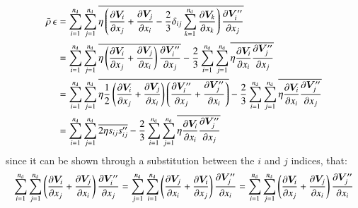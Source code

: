 \documentclass{warpdoc}
\newcommand{\alb}{\vspace{0.2cm}\\} %
\newcommand{\nd}{{{n}_{\rm d}}}
\newcommand{\mfd}{\displaystyle}
\begin{document}
\begin{align*}
    \wbar{\rho}\, \epsilon
     &=\mfd\sum_{i=1}^{\nd} \sum_{j=1}^{\nd}
      \overline{
                    \eta  \left( \frac{\partial \bm{V}_i}{\partial x_j}
                     + \frac{\partial \bm{V}_j}{\partial x_i}
                     - \frac{2}{3}  \delta_{ij}  \sum_{k=1}^{\nd} \frac{\partial \bm{V}_k}{\partial x_k}
                 \right)
                  \frac{\partial \bm{V}_i^{\prime\prime}}{\partial x_j}} \alb
      &=\mfd\sum_{i=1}^{\nd} \sum_{j=1}^{\nd}
            \overline{
               \eta  \left( \frac{\partial \bm{V}_i}{\partial x_j}
             + \frac{\partial \bm{V}_j}{\partial x_i} \right) \frac{\partial \bm{V}_i^{\prime\prime}}{\partial x_j}
            }
      -\frac{2}{3}  \sum_{i=1}^{\nd}\sum_{j=1}^{\nd}
            \overline{ \eta 
                  \frac{\partial \bm{V}_i}     {\partial x_i} 
                  \frac{\partial \bm{V}_j^{\prime\prime}}{\partial x_j}} \alb
      &=\mfd\sum_{i=1}^{\nd} \sum_{j=1}^{\nd}
            \overline{
               \eta  \frac{1}{2}
                   \left( \frac{\partial \bm{V}_i}{\partial x_j}
                        + \frac{\partial \bm{V}_j}{\partial x_i}
                   \right)
                   \left(
                          \frac{\partial \bm{V}_i^{\prime\prime}}{\partial x_j}
                        + \frac{\partial \bm{V}_j^{\prime\prime}}{\partial x_i}
                   \right)
            }
      -\frac{2}{3}  \sum_{i=1}^{\nd}\sum_{j=1}^{\nd}
            \overline{ \eta 
                  \frac{\partial \bm{V}_i}     {\partial x_i}
                   \frac{\partial \bm{V}_j^{\prime\prime}}{\partial x_j}} \alb
      &=\mfd\sum_{i=1}^{\nd} \sum_{j=1}^{\nd}
            \overline{
               2 \eta s_{ij} s_{ij}^{\prime\prime}
            }
      -\frac{2}{3}  \sum_{i=1}^{\nd}\sum_{j=1}^{\nd}
            \overline{ \eta 
                  \frac{\partial \bm{V}_i}     {\partial x_i}
                   \frac{\partial \bm{V}_j^{\prime\prime}}{\partial x_j}} 
\end{align*}
%
since it can be shown through a substitution between the $i$ and $j$ indices, that:
%
\begin{equation}
  \sum_{i=1}^{\nd} \sum_{j=1}^{\nd}
                \left( \frac{\partial \bm{V}_i}{\partial x_j}
             + \frac{\partial \bm{V}_j}{\partial x_i} \right) \frac{\partial \bm{V}_i^{\prime\prime}}{\partial x_j}
 = 
  \sum_{j=1}^{\nd} \sum_{i=1}^{\nd}
                \left( \frac{\partial \bm{V}_j}{\partial x_i}
             + \frac{\partial \bm{V}_i}{\partial x_j} \right) \frac{\partial \bm{V}_j^{\prime\prime}}{\partial x_i}
 = 
  \sum_{i=1}^{\nd} \sum_{j=1}^{\nd}
                \left( \frac{\partial \bm{V}_i}{\partial x_j}
             + \frac{\partial \bm{V}_j}{\partial x_i} \right) \frac{\partial \bm{V}_j^{\prime\prime}}{\partial x_i}
\end{equation}
\end{document}
